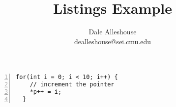 \documentclass{article}
\makeatletter
\newcommand{\me}{Dale Alleshouse}
\newcommand{\email}{dealleshouse@sei.cmu.edu}
\makeatother
\begin{document}
\title{Listings Example}
\author{\me\\\email}
\maketitle

\lstset{language=c++}
\lstset{caption=Super Bad Ass Code}
\begin{lstlisting}[frame=single, basicstyle=\ttfamily, numbers=left]
  for(int i = 0; i < 10; i++) {
    // increment the pointer
    *p++ = i;
  }
\end{lstlisting}



\end{document}
